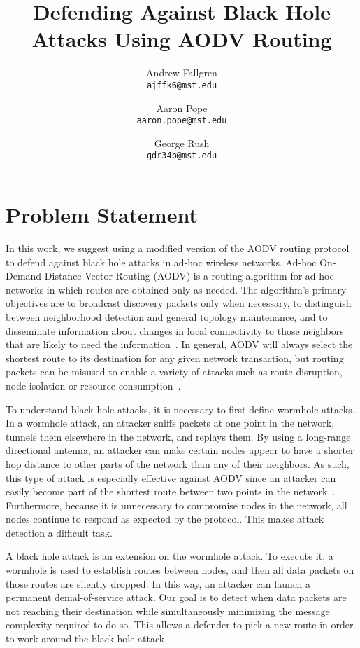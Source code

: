 \documentclass[12pt,a4paper]{report}
\author{
    Andrew Fallgren \\
    \texttt{ajffk6@mst.edu}
    \and
    Aaron Pope \\
    \texttt{aaron.pope@mst.edu}
    \and
    George Rush \\
    \texttt{gdr34b@mst.edu}
}
\title{Defending Against Black Hole Attacks Using AODV Routing}
\begin{document}
\maketitle

\tableofcontents

\pagebreak

\section{Problem Statement}
In this work, we suggest using a modified version of the AODV routing protocol to defend against black hole attacks in ad-hoc wireless networks. Ad-hoc On-Demand Distance Vector Routing (AODV) is a routing algorithm for ad-hoc networks in which routes are obtained only as needed. The algorithm's primary objectives are to broadcast discovery packets only when necessary, to distinguish between neighborhood detection and general topology maintenance, and to disseminate information about changes in local connectivity to those neighbors that are likely to need the information~\cite{749281}. In general, AODV will always select the shortest route to its destination for any given network transaction, but routing packets can be misused to enable a variety of attacks such as route disruption, node isolation or resource consumption~\cite{Ning2005795}.

To understand black hole attacks, it is necessary to first define wormhole attacks. In a wormhole attack, an attacker sniffs packets at one point in the network, tunnels them elsewhere in the network, and replays them. By using a long-range directional antenna, an attacker can make certain nodes appear to have a shorter hop distance to other parts of the network than any of their neighbors. As such, this type of attack is especially effective against AODV since an attacker can easily become part of the shortest route between two points in the network~\cite{1589115}. Furthermore, because it is unnecessary to compromise nodes in the network, all nodes continue to respond as expected by the protocol. This makes attack detection a difficult task.

A black hole attack is an extension on the wormhole attack. To execute it, a wormhole is used to establish routes between nodes, and then all data packets on those routes are silently dropped. In this way, an attacker can launch a permanent denial-of-service attack. Our goal is to detect when data packets are not reaching their destination while simultaneously minimizing the message complexity required to do so. This allows a defender to pick a new route in order to work around the black hole attack.
\end{document}
